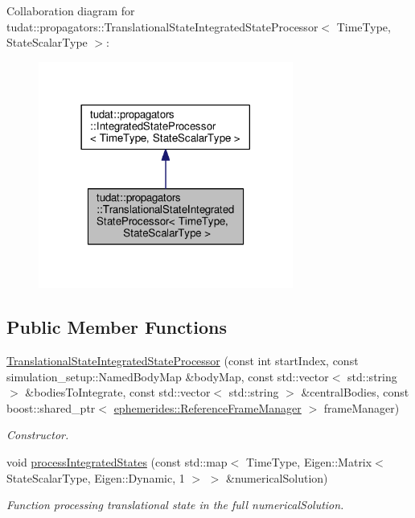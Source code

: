 Collaboration diagram for tudat\+:\+:propagators\+:\+:Translational\+State\+Integrated\+State\+Processor$<$ Time\+Type, State\+Scalar\+Type $>$\+:
\nopagebreak
\begin{figure}[H]
\begin{center}
\leavevmode
\includegraphics[width=237pt]{classtudat_1_1propagators_1_1TranslationalStateIntegratedStateProcessor__coll__graph}
\end{center}
\end{figure}
\subsection*{Public Member Functions}
\begin{DoxyCompactItemize}
\item 
\hyperlink{classtudat_1_1propagators_1_1TranslationalStateIntegratedStateProcessor_a49de6dace6eb8a06a5c03b7ef1f2ed3c}{Translational\+State\+Integrated\+State\+Processor} (const int start\+Index, const simulation\+\_\+setup\+::\+Named\+Body\+Map \&body\+Map, const std\+::vector$<$ std\+::string $>$ \&bodies\+To\+Integrate, const std\+::vector$<$ std\+::string $>$ \&central\+Bodies, const boost\+::shared\+\_\+ptr$<$ \hyperlink{classtudat_1_1ephemerides_1_1ReferenceFrameManager}{ephemerides\+::\+Reference\+Frame\+Manager} $>$ frame\+Manager)
\begin{DoxyCompactList}\small\item\em Constructor. \end{DoxyCompactList}\item 
void \hyperlink{classtudat_1_1propagators_1_1TranslationalStateIntegratedStateProcessor_af6a1bc3febf6a960c16a7186cfd4642a}{process\+Integrated\+States} (const std\+::map$<$ Time\+Type, Eigen\+::\+Matrix$<$ State\+Scalar\+Type, Eigen\+::\+Dynamic, 1 $>$ $>$ \&numerical\+Solution)
\begin{DoxyCompactList}\small\item\em Function processing translational state in the full numerical\+Solution. \end{DoxyCompactList}\end{DoxyCompactItemize}
